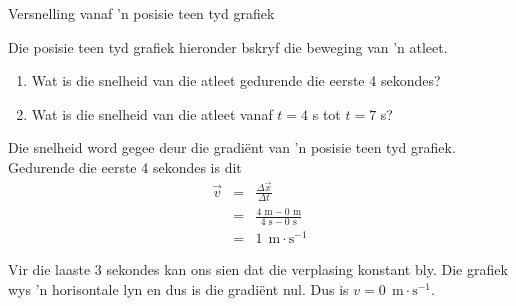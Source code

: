 \begin{wex}{Versnelling vanaf  'n posisie teen tyd grafiek}{Die posisie teen tyd grafiek hieronder bskryf die beweging van  'n atleet.\\
\begin{center}
\end{center}\begin{enumerate}[label=\textbf{\arabic*}.]
\item Wat is die snelheid van die atleet gedurende die eerste 4 sekondes?
\item Wat is die snelheid van die atleet vanaf $t=4$ s tot $t=7$ s?
\end{enumerate}}
{
Die snelheid word gegee deur die gradi\"ent van  'n posisie teen tyd grafiek. Gedurende die eerste 4 sekondes is dit
\begin{eqnarray*}
\vec{v}&=&\frac{\Delta \vec{x}}{\Delta t}\\
&=&\frac{4\text{~m} - 0\text{~m}}{4\text{~s} - 0\text{~s}}\\
&=&1\ ~\text{m}\cdot \text{s}^{-1}
\end{eqnarray*}

Vir die laaste 3 sekondes kan ons sien dat die verplasing konstant bly. Die grafiek wys  'n horisontale lyn en dus is die gradi\"ent nul. Dus is ${v}=0\ ~\text{m}\cdot \text{s}^{-1}$.}
\end{wex} 

